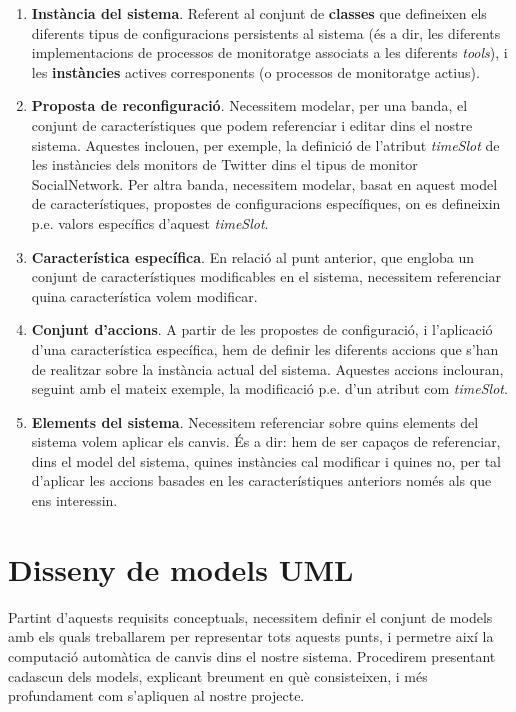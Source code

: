 \begin{enumerate}
\item \textbf{Instància del sistema}. Referent al conjunt de \textbf{classes} que defineixen els diferents tipus de configuracions persistents al sistema (és a dir, les diferents implementacions de processos de monitoratge associats a les diferents \textit{tools}), i les \textbf{instàncies} actives corresponents (o processos de monitoratge actius).
\item \textbf{Proposta de reconfiguració}. Necessitem modelar, per una banda, el conjunt de característiques que podem referenciar i editar dins el nostre sistema. Aquestes inclouen, per exemple, la definició de l'atribut \textit{timeSlot} de les instàncies dels monitors de Twitter dins el tipus de monitor SocialNetwork. Per altra banda, necessitem modelar, basat en aquest model de característiques, propostes de configuracions específiques, on es defineixin p.e. valors específics d'aquest \textit{timeSlot}.
\item \textbf{Característica específica}. En relació al punt anterior, que engloba un conjunt de característiques modificables en el sistema, necessitem referenciar quina característica volem modificar.
\item \textbf{Conjunt d'accions}. A partir de les propostes de configuració, i l'aplicació d'una característica específica, hem de definir les diferents accions que s'han de realitzar sobre la instància actual del sistema. Aquestes accions inclouran, seguint amb el mateix exemple, la modificació p.e. d'un atribut com \textit{timeSlot}.
\item \textbf{Elements del sistema}. Necessitem referenciar sobre quins elements del sistema volem aplicar els canvis. És a dir: hem de ser capaços de referenciar, dins el model del sistema, quines instàncies cal modificar i quines no, per tal d'aplicar les accions basades en les característiques anteriors només als que ens interessin.
\end{enumerate}

\section{Disseny de models UML}

Partint d'aquests requisits conceptuals, necessitem definir el conjunt de models amb els quals treballarem per representar tots aquests punts, i permetre així la computació automàtica de canvis dins el nostre sistema. Procedirem presentant cadascun dels models, explicant breument en què consisteixen, i més profundament com s'apliquen al nostre projecte.\\

